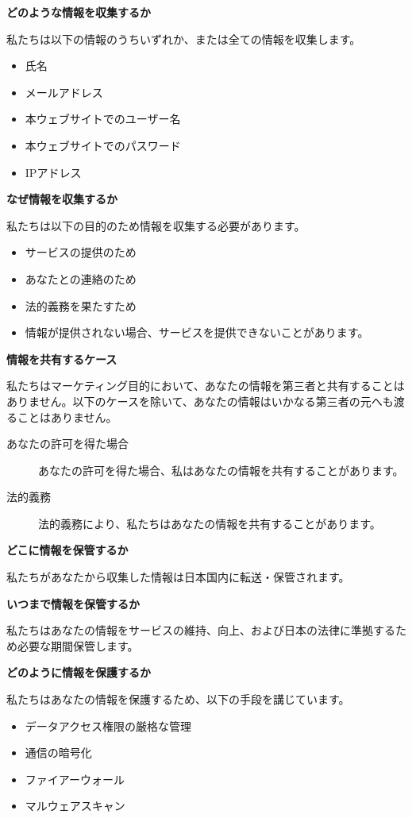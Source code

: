 \documentclass[titlepage,10pt,a4paper,uplatex]{jsbook}
\newenvironment{content}{\begin{shaded}\vspace{-1em}\raggedright\ttfamily\footnotesize\setlength{\baselineskip}{1.4em}}{\end{shaded}\vspace{-1em}}
\renewcommand{\textbf}[1]{{\bfseries\sffamily#1}}
\begin{document}
\begin{content}
\textbf{\Large どのような情報を収集するか}

私たちは以下の情報のうちいずれか、または全ての情報を収集します。

\begin{itemize}
\item 氏名
\item メールアドレス
\item 本ウェブサイトでのユーザー名
\item 本ウェブサイトでのパスワード
\item IPアドレス
\end{itemize}

\textbf{\Large なぜ情報を収集するか}

私たちは以下の目的のため情報を収集する必要があります。

\begin{itemize}
\item サービスの提供のため
\item あなたとの連絡のため
\item 法的義務を果たすため
\item 情報が提供されない場合、サービスを提供できないことがあります。
\end{itemize}

\textbf{\Large 情報を共有するケース}

私たちはマーケティング目的において、あなたの情報を第三者と共有することはありません。以下のケースを除いて、あなたの情報はいかなる第三者の元へも渡ることはありません。

\begin{description}
\item[あなたの許可を得た場合] あなたの許可を得た場合、私はあなたの情報を共有することがあります。
\item[法的義務] 法的義務により、私たちはあなたの情報を共有することがあります。
\end{description}

\textbf{\Large どこに情報を保管するか}

私たちがあなたから収集した情報は日本国内に転送・保管されます。

\textbf{\Large いつまで情報を保管するか}

私たちはあなたの情報をサービスの維持、向上、および日本の法律に準拠するため必要な期間保管します。

\textbf{\Large どのように情報を保護するか}

私たちはあなたの情報を保護するため、以下の手段を講じています。

\begin{itemize}
\item データアクセス権限の厳格な管理
\item 通信の暗号化
\item ファイアーウォール
\item マルウェアスキャン
\end{itemize}


\end{content}
\end{document}
